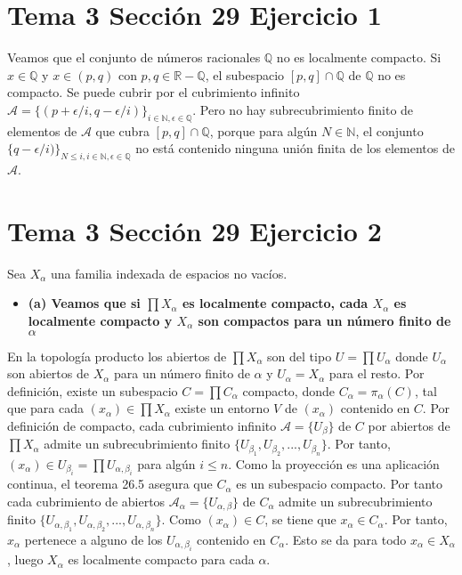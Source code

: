 \documentclass{article}
\begin{document}
\section{Tema 3 Sección 29 Ejercicio 1}
Veamos que el conjunto de números racionales $\mathbb{Q}$ no es localmente compacto.
Si $x\in \mathbb{Q}$ y $x\in (p,q)$ con $p,q\in\mathbb{R}-\mathbb{Q}$, el subespacio $[p,q]\cap \mathbb{Q}$ de $\mathbb{Q}$ no es compacto. Se puede cubrir por el cubrimiento infinito $\mathcal{A}=\{(p+\epsilon/i,q-\epsilon/i)\}_{i\in \mathbb{N},\epsilon\in \mathbb{Q}}$. Pero no hay subrecubrimiento finito de elementos de $\mathcal{A}$ que cubra $[p,q]\cap \mathbb{Q}$, porque para algún $N\in \mathbb{N}$, el conjunto $\{q-\epsilon/i)\}_{N\leq i, i\in \mathbb{N},\epsilon\in \mathbb{Q}}$ no está contenido ninguna unión finita de los elementos de $\mathcal{A}$.
\section{Tema 3 Sección 29 Ejercicio 2}
Sea $X_\alpha$ una familia indexada de espacios no vacíos.
\begin{itemize}
\item \bf (a) \rm Veamos que si $ \prod X_\alpha$ es localmente compacto, cada $X_\alpha$ es localmente compacto y $X_\alpha$ son compactos para un número finito de $\alpha$
\end{itemize}
En la topología producto los abiertos de $\prod X_\alpha$ son del tipo $U =\prod U_\alpha$ donde $U_\alpha$ son abiertos de $X_\alpha$ para un número finito de $\alpha$ y $U_\alpha=X_\alpha$ para el resto. Por definición, existe un subespacio $C=\prod C_\alpha$ compacto, donde $C_\alpha=\pi_\alpha(C)$, tal que para cada $(x_\alpha)\in \prod X_\alpha$ existe un entorno $V$ de $(x_\alpha)$ contenido en $C$. Por definición de compacto, cada cubrimiento infinito $\mathcal{A}=\{U_\beta\}$ de $C$ por abiertos de $\prod X_\alpha$ admite un subrecubrimiento finito $ \{U_{\beta_1},U_{\beta_2},...,U_{\beta_n}\}$. Por tanto, $(x_\alpha)\in U_{\beta_i}=\prod U_{\alpha,\beta_i}$ para algún $i\leq n$. Como la proyección es una aplicación continua, el teorema 26.5 asegura que $C_\alpha$ es un subespacio compacto.   Por tanto cada cubrimiento de abiertos $\mathcal{A}_\alpha=\{U_{\alpha,\beta}\}$ de $C_\alpha$ admite un subrecubrimiento finito $\{U_{\alpha,\beta_1},U_{\alpha,\beta_2},...,U_{\alpha,\beta_n}\}$. Como $(x_\alpha)\in C$, se tiene que   $x_\alpha\in C_\alpha$. Por tanto,  $x_\alpha$ pertenece a alguno de los $U_{\alpha,\beta_i}$ contenido en $C_\alpha$. Esto se da para todo $x_\alpha\in X_\alpha$, luego $X_\alpha$ es localmente compacto para cada $\alpha$.
\end{document}
